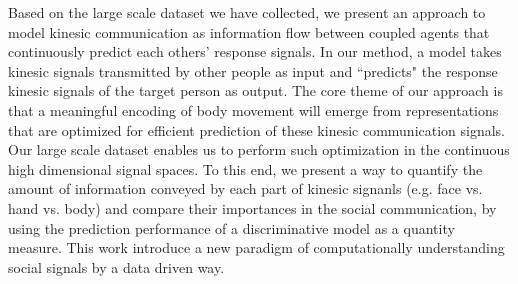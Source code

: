Based on the large scale dataset we have collected, we present an approach to model kinesic communication as information flow between coupled agents that continuously predict each others' response signals. In our method, a model takes kinesic signals transmitted by other people as input and ``predicts" the response kinesic signals of the target person as output. The core theme of our approach is that a meaningful encoding of body movement will emerge from representations that are optimized for efficient prediction of these kinesic communication signals. Our large scale dataset enables us to perform such optimization in the continuous high dimensional signal spaces. To this end, we present a way to quantify the amount of information conveyed by each part of kinesic signanls (e.g. face vs. hand vs. body) and compare their importances in the social communication, by using the prediction performance of a discriminative model as a quantity measure. This work introduce a new paradigm of computationally understanding social signals by a data driven way.%







